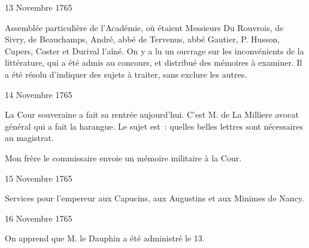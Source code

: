                      \begin{diary}{13 Novembre 1765}{}
                        
                         Assemblée particulière de l'Académie, où
                           étaient Messieurs
                           Du Rouvrois, de Sivry, de
                              Beauchamps, André,
                              abbé de Tervenus,
                           abbé Gautier, P. Husson, Cupers, Coster et
                           Durival l'aîné. On y a lu
                              un ouvrage sur
                              les inconvénients de la littérature, qui a été
                           admis au concours, et distribué des mémoires
                           à examiner. Il a été résolu d'indiquer
                           des sujets à traiter, sans exclure les autres. \bigskip
        
        
                     \end{diary}

                     \begin{diary}{14 Novembre 1765}{}
                        
                        
                           La Cour souveraine a fait sa
                           rentrée aujourd'hui.
                           C'est M. de La Milliere
                           avocat général qui a fait
                           la harangue. Le sujet
                           est : quelles belles lettres
                           sont nécessaires au magistrat. \bigskip
        
        
                        
                           Mon frère le commissaire
                           envoie
                           un
                              mémoire militaire à la Cour. \bigskip
        
        
                     \end{diary}

                     \begin{diary}{15 Novembre 1765}{}
                        
                         Services pour l'empereur aux Capucins, aux
                              Augustins et aux Minimes de Nancy. \bigskip
        
        
                     \end{diary}

                     \begin{diary}{16 Novembre 1765}{}
                        
                         On apprend que M. le Dauphin a
                           été
                           administré
                           le 13. \bigskip
        
        
                     \end{diary}

